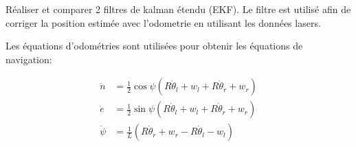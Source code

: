 \documentclass[addpoints]{exam}
\begin{document}
\begin{questions}
\begin{solution}
\end{solution}

\question

Réaliser et comparer 2 filtres de kalman étendu (EKF). Le filtre est utilisé afin de corriger la position estimée avec l'odometrie en utilisant les données lasers.\vspace{3mm}


Les équations d'odométries sont utilisées pour obtenir les équations de navigation:

\begin{align}
    \dot{n} &= \frac{1}{2}\cos{\psi}(R\dot{\theta}_l+w_l + R\dot{\theta}_r+w_r)\\
    \dot{e} &= \frac{1}{2}\sin{\psi}(R\dot{\theta}_l+w_l + R\dot{\theta}_r+w_r)\\
    \dot{\psi} &= \frac{1}{L}(R\dot{\theta}_r+w_r - R\dot{\theta}_l-w_l)
\end{align}


\end{questions}
\end{document}
